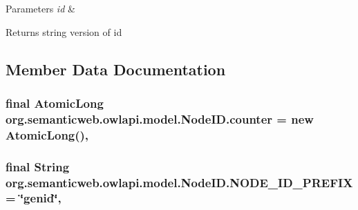 \begin{DoxyParams}{Parameters}
{\em id} & \\
\hline
\end{DoxyParams}
\begin{DoxyReturn}{Returns}
string version of id 
\end{DoxyReturn}


\subsection{Member Data Documentation}
\hypertarget{classorg_1_1semanticweb_1_1owlapi_1_1model_1_1_node_i_d_a8f9355706577a575363bbb4a10b085b5}{
\subsubsection[{counter}]{\setlength{\rightskip}{0pt plus 5cm}final Atomic\-Long org.\-semanticweb.\-owlapi.\-model.\-Node\-I\-D.\-counter = new Atomic\-Long()\hspace{0.3cm}{\ttfamily [static]}, {\ttfamily [private]}}}\label{classorg_1_1semanticweb_1_1owlapi_1_1model_1_1_node_i_d_a8f9355706577a575363bbb4a10b085b5}
\hypertarget{classorg_1_1semanticweb_1_1owlapi_1_1model_1_1_node_i_d_acb0ec7dfc06f24bd5f1ef7d40859546a}{
\subsubsection[{N\-O\-D\-E\-\_\-\-I\-D\-\_\-\-P\-R\-E\-F\-I\-X}]{\setlength{\rightskip}{0pt plus 5cm}final String org.\-semanticweb.\-owlapi.\-model.\-Node\-I\-D.\-N\-O\-D\-E\-\_\-\-I\-D\-\_\-\-P\-R\-E\-F\-I\-X = \char`\"{}genid\char`\"{}\hspace{0.3cm}{\ttfamily [static]}, {\ttfamily [private]}}}\label{classorg_1_1semanticweb_1_1owlapi_1_1model_1_1_node_i_d_acb0ec7dfc06f24bd5f1ef7d40859546a}
